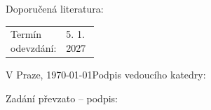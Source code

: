 \documentclass[11pt, a4paper]{article}
\newcommand{\termin}{5. 1. 2027}
\begin{document}
Doporučená literatura:
\renewcommand{\section}[2]{}
\let\oldbibliography\thebibliography
\renewcommand{\thebibliography}[1]{\small\oldbibliography{#1}\setlength{\itemsep}{0pt}\setlength{\parsep}{0pt}}
\nocite{harrington1968field, catedra1995cgfft, chan1996sine, strang1999discrete, vecchi1999loop, andriulli2013well, adrian2019refinement, harrington1971theory}

\begin{otherlanguage}{english}

\end{otherlanguage}

\vspace{2ex}

\begin{tabularx}{\linewidth}{@{} p{0.25\linewidth} X @{}}
    Termín odevzdání: & \termin
\end{tabularx}

\vspace{2ex}

V Praze, \today \hfill Podpis vedoucího katedry: \hspace{3cm}

\vspace{2ex}

Zadání převzato -- podpis: \dotfill
\end{document}
